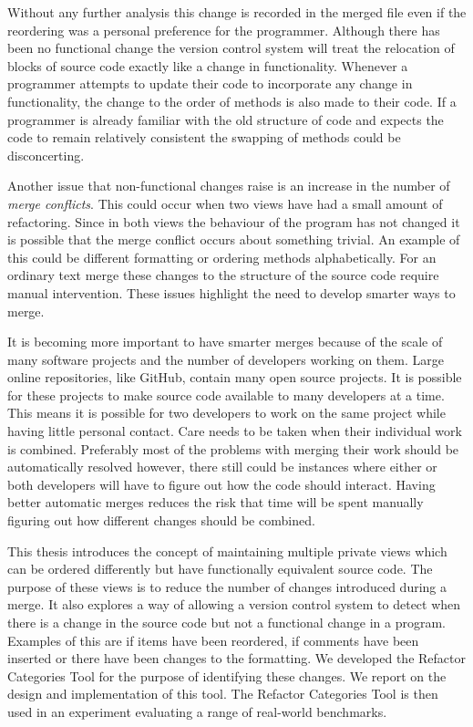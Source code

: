 Without any further analysis this change is recorded in the merged file even if the reordering was a personal preference for the programmer.  Although there has been no functional change the version control system will treat the relocation of blocks of source code exactly like a change in functionality.  Whenever a programmer attempts to update their code to incorporate any change in functionality, the change to the order of methods is also made to their code.  If a programmer is already familiar with the old structure of code and expects the code to remain relatively consistent the swapping of methods could be disconcerting.

Another issue that non-functional changes raise is an increase in the number of \emph{merge conflicts}. This could occur when two views have had a small amount of refactoring.  Since in both views the behaviour of the program has not changed it is possible that the merge conflict occurs about something trivial. An example of this could be different formatting or ordering methods alphabetically. For an ordinary text merge these changes to the structure of the source code require manual intervention. These issues highlight the need to develop smarter ways to merge.

It is becoming more important to have smarter merges because of the scale of many software projects and the number of developers working on them.
Large online repositories, like GitHub, contain many open source projects.
It is possible for these projects to make source code available to many developers at a time.
This means it is possible for two developers to work on the same project while having little personal contact.
Care needs to be taken when their individual work is combined.
Preferably most of the problems with merging their work should be automatically resolved however,
there still could be instances where either or both developers will have to figure out how the code should interact.
Having better automatic merges reduces the risk that time will be spent manually figuring out how different changes should be combined.

This thesis introduces the concept of maintaining multiple private views which can be ordered differently but have functionally equivalent source code.
The purpose of these views is to reduce the number of changes introduced during a merge. 
It also explores a way of allowing a version control system to detect when there is a change in the source code but not a functional change in a program.
Examples of this are if items have been reordered, if comments have been inserted or there have been changes to the formatting. 
We developed the Refactor Categories Tool for the purpose of identifying these changes. 
We report on the design and implementation of this tool.
The Refactor Categories Tool is then used in an experiment evaluating a range of real-world benchmarks.


